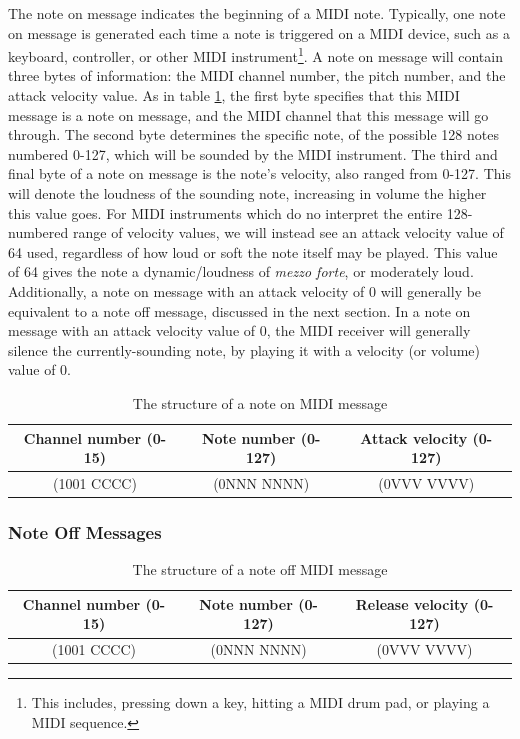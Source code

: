 The note on message indicates the beginning of a MIDI note. Typically, one note on message is generated each time a note is triggered on a MIDI device, such as a keyboard, controller, or other MIDI instrument\footnote{This includes, pressing down a key, hitting a MIDI drum pad, or playing a MIDI sequence.}. A note on message will contain three bytes of information: the MIDI channel number, the pitch number, and the attack velocity value. As in table \ref{tbl:byte-structure-note-on}, the first byte specifies that this MIDI message is a note on message, and the MIDI channel that this message will go through. The second byte determines the specific note, of the possible 128 notes numbered 0-127, which will be sounded by the MIDI instrument. The third and final byte of a note on message is the note's velocity, also ranged from 0-127. This will denote the loudness of the sounding note, increasing in volume the higher this value goes. For MIDI instruments which do no interpret the entire 128-numbered range of velocity values, we will instead see an attack velocity value of 64 used, regardless of how loud or soft the note itself may be played. This value of 64 gives the note a dynamic/loudness of \textit{mezzo forte}, or moderately loud. Additionally, a note on message with an attack velocity of 0 will generally be equivalent to a note off message, discussed in the next section. In a note on message with an attack velocity value of 0, the MIDI receiver will generally silence the currently-sounding note, by playing it with a velocity (or volume) value of 0\cite{Huber_2012}.

\begin{table}
	\centering
	\begin{tabular}{|c|c|c|}
	\hline
		Channel number (0-15) & Note number (0-127) & Attack velocity (0-127) \\
		\hline
		(1001 CCCC) & (0NNN NNNN) & (0VVV VVVV) \\
	\hline
	\end{tabular}
	\caption{The structure of a note on MIDI message}
	\label{tbl:byte-structure-note-on}
\end{table}

\subsubsection{Note Off Messages}

\begin{table}
	\centering
	\begin{tabular}{|c|c|c|}
	\hline
		Channel number (0-15) & Note number (0-127) & Release velocity (0-127) \\
		\hline
		(1001 CCCC) & (0NNN NNNN) & (0VVV VVVV) \\
	\hline
	\end{tabular}
	\caption{The structure of a note off MIDI message}
	\label{tbl:byte-structure-note-off}
\end{table}

